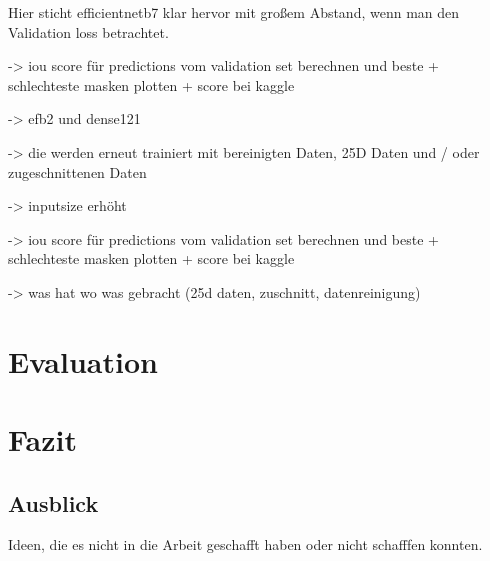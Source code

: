 Hier sticht efficientnetb7 klar hervor mit großem Abstand, wenn man den Validation loss betrachtet. 

-> iou score für predictions vom validation set berechnen und beste + schlechteste masken plotten + score bei kaggle 

-> efb2 und dense121 

-> die werden erneut trainiert mit bereinigten Daten, 25D Daten und / oder zugeschnittenen Daten

-> inputsize erhöht

-> iou score für predictions vom validation set berechnen und beste + schlechteste masken plotten + score bei kaggle 

-> was hat wo was gebracht (25d daten, zuschnitt, datenreinigung) 

\section{Evaluation}\raggedbottom

\section{Fazit}\raggedbottom

\subsection{Ausblick}
Ideen, die es nicht in die Arbeit geschafft haben oder nicht schafffen konnten.


\pagebreak
